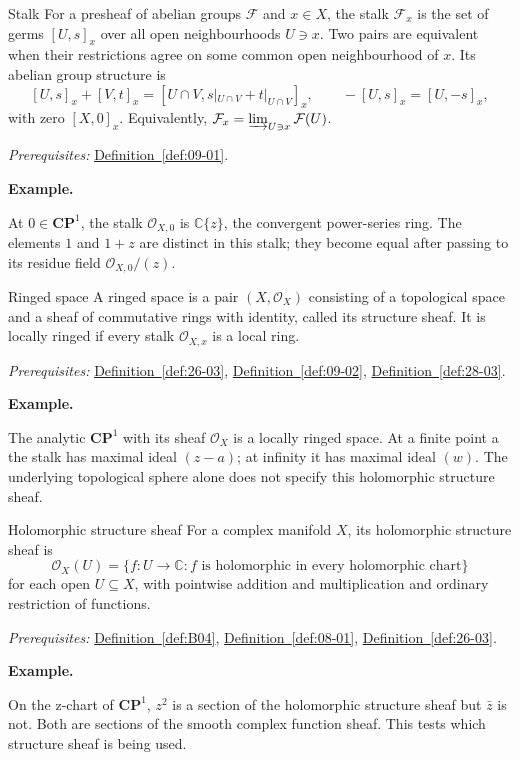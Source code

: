 \documentclass[11pt]{article}
\makeatletter
\newcommand{\C}{\mathbb C}
\newcounter{definition}
\newcommand{\CP}{\mathbf{CP}}
\newcommand{\exampleheading}{\par\medskip\textbf{Example.}\par\smallskip}
\newcommand{\currentdefinition}[1]{\protected@edef\@currentlabel{#1}}
\makeatother
\begin{document}
\begin{definitionbox}{Stalk}
\currentdefinition{\thedefinition}
\label{def:09-02}
For a presheaf of abelian groups $\mathcal F$ and $x\in X$, the stalk $\mathcal F_x$ is the set of germs $[U,s]_x$ over all open neighbourhoods $U\ni x$. Two pairs are equivalent when their restrictions agree on some common open neighbourhood of $x$. Its abelian group structure is
\[[U,s]_x+[V,t]_x=[U\cap V,s|_{U\cap V}+t|_{U\cap V}]_x,\qquad-[U,s]_x=[U,-s]_x,\]
with zero $[X,0]_x$. Equivalently, $\mathcal F_x=\varinjlim_{U\ni x}\mathcal F(U)$.

\smallskip
\textit{Prerequisites:} \hyperref[def:09-01]{Definition~\ref*{def:09-01}}.

\exampleheading
At $0\in\CP^1$, the stalk $\mathcal O_{X,0}$ is $\C\{z\}$, the convergent power-series ring. The elements $1$ and $1+z$ are distinct in this stalk; they become equal after passing to its residue field $\mathcal O_{X,0}/(z)$.
\end{definitionbox}

\begin{definitionbox}{Ringed space}
\currentdefinition{\thedefinition}
\label{def:N03}
A ringed space is a pair $(X,\mathcal O_X)$ consisting of a topological space and a sheaf of commutative rings with identity, called its structure sheaf. It is locally ringed if every stalk $\mathcal O_{X,x}$ is a local ring.

\smallskip
\textit{Prerequisites:} \hyperref[def:26-03]{Definition~\ref*{def:26-03}}, \hyperref[def:09-02]{Definition~\ref*{def:09-02}}, \hyperref[def:28-03]{Definition~\ref*{def:28-03}}.

\exampleheading
The analytic $\CP^1$ with its sheaf $\mathcal O_X$ is a locally ringed space. At a finite point a the stalk has maximal ideal $(z-a)$; at infinity it has maximal ideal $(w)$. The underlying topological sphere alone does not specify this holomorphic structure sheaf.
\end{definitionbox}

\begin{definitionbox}{Holomorphic structure sheaf}
\currentdefinition{\thedefinition}
\label{def:N04}
For a complex manifold $X$, its holomorphic structure sheaf is
\[\mathcal O_X(U)=\{f:U\to\C:f\text{ is holomorphic in every holomorphic chart}\}\]
for each open $U\subseteq X$, with pointwise addition and multiplication and ordinary restriction of functions.

\smallskip
\textit{Prerequisites:} \hyperref[def:B04]{Definition~\ref*{def:B04}}, \hyperref[def:08-01]{Definition~\ref*{def:08-01}}, \hyperref[def:26-03]{Definition~\ref*{def:26-03}}.

\exampleheading
On the z-chart of $\CP^1$, $z^2$ is a section of the holomorphic structure sheaf but $\bar z$ is not. Both are sections of the smooth complex function sheaf. This tests which structure sheaf is being used.
\end{definitionbox}
\end{document}
